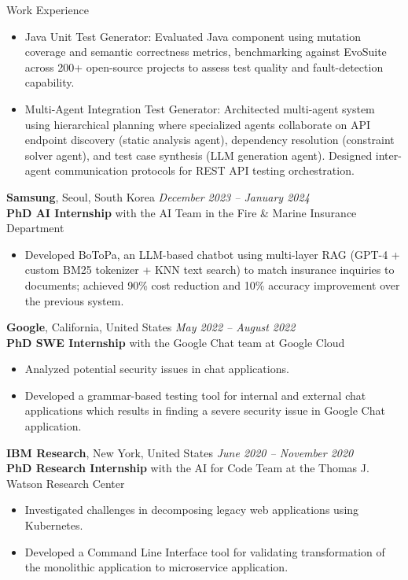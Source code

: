 \documentclass{resume} %
\begin{document}
\begin{rSection}{Work Experience}
\begin{itemize}
  \item Java Unit Test Generator: Evaluated Java component using mutation coverage and semantic 
  correctness metrics, benchmarking against EvoSuite across 200+ open-source projects to 
  assess test quality and fault-detection capability.
  \item Multi-Agent Integration Test Generator: Architected multi-agent system using hierarchical 
  planning where specialized agents collaborate on API endpoint discovery (static analysis 
  agent), dependency resolution (constraint solver agent), and test case synthesis (LLM 
  generation agent). Designed inter-agent communication protocols for REST API testing 
  orchestration.
\end{itemize}

{\bf Samsung}, Seoul, South Korea \hfill {\em December 2023 – January 2024} \\
{\bf PhD AI Internship} with the AI Team in the Fire \& Marine Insurance Department
\begin{itemize}
    \item Developed BoToPa, an LLM-based chatbot using multi-layer RAG (GPT-4 + custom BM25 tokenizer + KNN text search) to match insurance inquiries to documents; achieved 90\% cost reduction and 10\% accuracy improvement over the previous system.
\end{itemize}

{\bf Google}, California, United States \hfill {\em May 2022 – August 2022} \\
{\bf PhD SWE Internship} with the Google Chat team at Google Cloud
\begin{itemize}
    \item Analyzed potential security issues in chat applications.
    \item Developed a grammar-based testing tool for internal and external chat applications which results in finding a severe security issue in Google Chat application.
\end{itemize}

{\bf IBM Research}, New York, United States \hfill {\em June 2020 – November 2020} \\
{\bf PhD Research Internship} with the AI for Code Team at the Thomas J. Watson Research Center
\begin{itemize}
    \item Investigated challenges in decomposing legacy web applications using Kubernetes.
    \item Developed a Command Line Interface tool for validating transformation of the monolithic application to microservice application.
\end{itemize}

\end{rSection}
\end{document}
